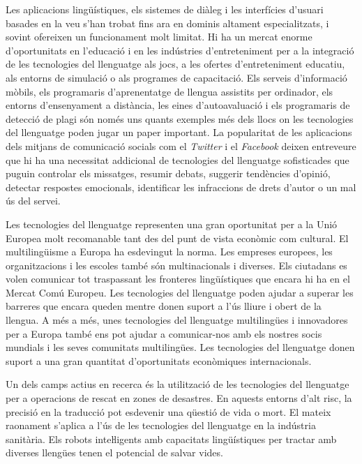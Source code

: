 \begin{multicols}{2}
Les aplicacions lingüístiques, els sistemes de diàleg i les interfícies d’usuari basades en la veu s’han trobat fins ara en dominis altament especialitzats, i sovint ofereixen un funcionament molt limitat. Hi ha un mercat enorme d’oportunitats en l’educació i en les indústries d’entre\-te\-ni\-ment per a la integració de les tecnologies del llenguatge als jocs, a les ofertes d'entre\-te\-ni\-ment educatiu, als entorns de simulació o als programes de capacitació. Els serveis d’informació mòbils, els programaris d’aprenentatge de llengua assistits per ordinador, els entorns d’ensenyament a distància, les eines d’autoavaluació i els programaris de detecció de plagi són només uns quants exemples més dels llocs on les tecnologies del llenguatge poden jugar un paper important. La popularitat de les aplicacions dels mitjans de comunicació socials com el \textit{Twitter} i el \textit{Facebook} deixen entreveure que hi ha una necessitat addicional de tecnologies del llenguatge sofisticades que puguin controlar els missatges, resumir debats, suggerir tendències d’opinió, detectar respostes emocionals, identificar les infraccions de drets d’autor o un mal ús del servei. 

Les tecnologies del llenguatge representen una gran oportunitat per a la Unió Europea molt recomanable tant des del punt de vista econòmic com cultural.  El multilingüisme a Europa ha esdevingut la norma.  Les empreses europees, les organitzacions i les escoles també són multinacionals i diverses. Els ciutadans es volen comunicar tot traspassant les fronteres lingüístiques que encara hi ha en el Mercat Comú Europeu. Les tecnologies del llenguatge poden ajudar a superar les barreres que encara queden mentre donen suport a l’ús lliure i obert de la llengua. A més a més, unes tecnologies del llenguatge multilingües i innovadores per a Europa també ens pot ajudar a comunicar-nos amb els nostres socis mundials i les seves comunitats multilingües. Les tecnologies del llenguatge donen suport a una gran quantitat d’oportunitats econòmiques internacionals.


Un dels camps actius en recerca és la utilització de les tecnologies del llenguatge per a operacions de rescat en zones de desastres. En aquests entorns d’alt risc, la precisió en la traducció pot esdevenir una qüestió de vida o mort. El mateix raonament s’aplica a l’ús de les tecnologies del llenguatge en la indústria sanitària. Els robots inteŀligents amb capacitats lingüístiques per tractar amb diverses llengües tenen el potencial de salvar vides. 


\end{multicols}
